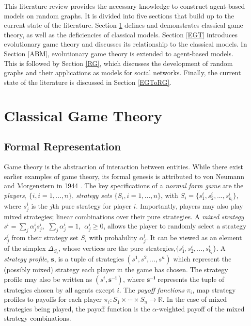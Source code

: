 
This literature review provides the necessary knowledge to construct agent-based models on random graphs. It is divided into five sections that build up to the current state of the literature. Section \ref{CGT} defines and demonstrates classical game theory, as well as the deficiencies of classical models. Section \ref{EGT} introduces evolutionary game theory and discusses its relationship to the classical models. In Section \ref{ABM}, evolutionary game theory is extended to agent-based models. This is followed by Section \ref{RG}, which discusses the development of random graphs and their applications as models for social networks. Finally, the current state of the literature is discussed in Section \ref{EGToRG}. \\

\section{Classical Game Theory} \label{CGT}

\subsection{Formal Representation}
Game theory is the abstraction of interaction between entities. While there exist earlier examples of game theory, its formal genesis is attributed to von Neumann and Morgenstern in 1944 \cite{RN99, RN27}. The key specifications of a \emph{normal form game} are the \emph{players, $\{i, i = 1, \dots ,n\}$}, \emph{strategy sets $ \{S_i, i = 1, \dots ,n\}$}, with $ S_i = \{s_{1}^i, s_{2}^i,\dots, s_{k_i}^i\}$, where $s_{j}^i$ is the $j$th pure strategy for player $i$. Importantly, players may also play mixed strategies; linear combinations over their pure strategies. A \emph{mixed strategy} $s^i = \sum_{j} \alpha_j^i s_{j}^i$, $~\sum_{j} \alpha_j^i = 1$, $~\alpha_j^i \geq 0$, allows the player to randomly select a strategy $s_{j}^i$ from their strategy set $S_i$ with probability $\alpha_j^i$. It can be viewed as an element of the simplex $\Delta_{S_i}$, whose vertices are the pure strategies,$\{s_{1}^i, s_{2}^i,\dots, s_{k_i}^i\}$.  A \emph{strategy profile}, $\mathbf{s}$, is a tuple of strategies $(s^1, s^2, \dots, s^n)$ which represent the (possibly mixed) strategy each player in the game has chosen. The strategy profile may also be written as $(s^i, \mathbf{s^{-i}})$, where $\mathbf{s^{-i}}$ represents the tuple of strategies chosen by all agents except $i$. The \emph{payoff functions} $\pi_i$, map strategy profiles to payoffs for each player $\pi_i: S_1 \times \cdots \times S_n \to \mathbb R$. In the case of mixed strategies being played, the payoff function is the $\alpha$-weighted payoff of the mixed strategy combinations. \\ %


